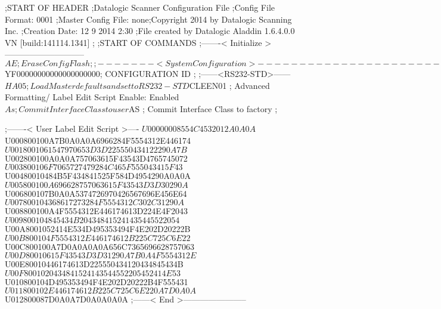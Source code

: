 ;START OF HEADER
;Datalogic Scanner Configuration File
;Config File Format: 0001
;Master Config File: none;Copyright 2014 by Datalogic Scanning Inc.
;Creation Date: 12 9 2014 2:30
;File created by Datalogic Aladdin 1.6.4.0.0 VN [build:141114.1341]
;
;START OF COMMANDS
;-------< Initialize >-----------------------------
$AE                 ; Erase Config Flash
;
;-------< System Configuration >-------------------------------
$YF00000000000000000000; CONFIGURATION ID
;
;------<RS232-STD>------
$HA05               ; Load Master defaults and set to RS232-STD
$CLEEN01            ; Advanced Formatting/ Label Edit Script Enable: Enabled
$As                 ; Commit Interface Class to user
$AS                 ; Commit Interface Class to factory
;

;-------< User Label Edit Script >----
$U00000008554C4532012A0A0A
$U000800100A7B0A0A0A6966284F5554312E446174
$U0018001061547970653D3D225550434122290A7B
$U002800100A0A0A757063615F43543D4765745072
$U003800106F7065727479284C465F555043415F43
$U00480010484B5F434841525F584D4954290A0A0A
$U005800100A696628757063615F43543D3D30290A
$U006800107B0A0A5374726970426567696E456E64
$U007800104368617273284F5554312C302C31290A
$U008800100A4F5554312E446174613D224E4F2043
$U009800104845434B204348415241435445522054
$U00A8001052414E534D495353494F4E202D20222B
$U00B800104F5554312E446174612B225C725C6E22
$U00C800100A7D0A0A0A0A656C7365696628757063
$U00D80010615F43543D3D31290A7B0A4F5554312E
$U00E80010446174613D225550434120434845434B
$U00F8001020434841524143544552205452414E53
$U010800104D495353494F4E202D20222B4F555431
$U011800102E446174612B225C725C6E220A7D0A0A
$U012800087D0A0A7D0A0A0A0A
;------< End >-----------------------
